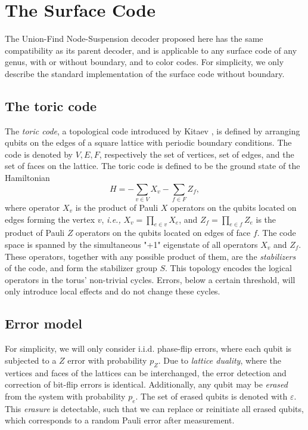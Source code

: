 \section{The Surface Code}\label{sec:surfacecode}

The Union-Find Node-Suspension decoder proposed here has the same compatibility as its parent decoder, and is applicable to any surface code of any genus, with or without boundary, and to color codes. For simplicity, we only describe the standard implementation of the surface code without boundary.

\subsection{The toric code}

The \emph{toric code}, a topological code introduced by Kitaev \cite{kitaev2003fault}, is defined by arranging qubits on the edges of a square lattice with periodic boundary conditions. The code is denoted by $V,E,F$, respectively the set of vertices, set of edges, and the set of faces on the lattice. The toric code is defined to be the ground state of the Hamiltonian 
\begin{equation}
    H = -\sum_{v \in V} X_v -\sum_{f \in F} Z_f, 
\end{equation}
where operator $X_v$ is the product of Pauli $X$ operators on the qubits located on edges forming the vertex $v$, \emph{i.e.,} $X_v = \prod_{e \in v} X_e$, and $Z_f = \prod_{e \in f} Z_e$ is the product of Pauli $Z$ operators on the qubits located on edges of face $f$. The code space is spanned by the simultaneous "+1" eigenstate of all operators $X_v$ and $Z_f$. These operators, together with any possible product of them, are the \emph{stabilizers} of the code, and form the stabilizer group $S$. This topology encodes the logical operators in the torus' non-trivial cycles. Errors, below a certain threshold, will only introduce local effects and do not change these cycles.

\subsection{Error model}\label{sec:errormodel}
For simplicity, we will only consider i.i.d. phase-flip errors, where each qubit is subjected to a $Z$ error with probability $p_Z$. Due to \emph{lattice duality}, where the vertices and faces of the lattices can be interchanged, the error detection and correction of bit-flip errors is identical. 
Additionally, any qubit may be \emph{erased} from the system with probability $p_e$. The set of erased qubits is denoted with $\varepsilon$. This \emph{erasure} is detectable, such that we can replace or reinitiate all erased qubits, which corresponds to a random Pauli error after measurement. 

